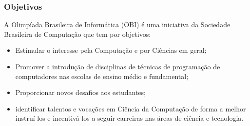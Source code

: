 \begin{frame}
 \frametitle{Objetivos}
 A Olimpíada Brasileira de Informática (OBI) é uma iniciativa da Sociedade Brasileira de Computação que tem por objetivos:
 \begin{itemize}
  \item Estimular o interesse pela Computação e por Ciências em geral;
  \item Promover a introdução de disciplinas de técnicas de programação
  de computadores nas escolas de ensino médio e fundamental;
  \item Proporcionar novos desafios aos estudantes;
  \item identificar talentos e vocações em Ciência da Computação de
  forma a melhor instruí-los e incentivá-los a seguir
  carreiras nas áreas de ciência e tecnologia. 
 \end{itemize}
\end{frame}
